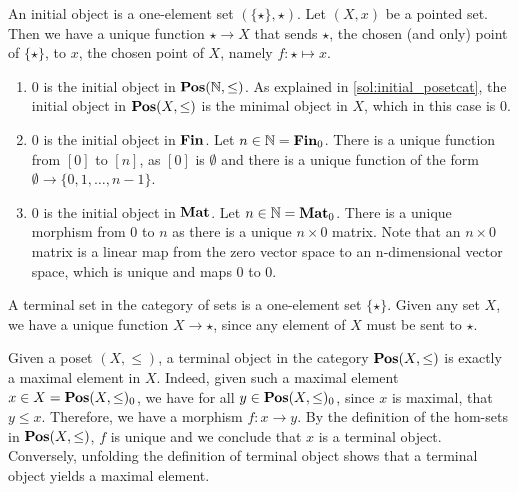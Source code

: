 \begin{solution}\label{sol:initial_pointset}
	An initial object is a one-element set $ (\{ \star \}, \star) $. Let $ (X, x) $ be a pointed set. Then we have a unique function $ \star \to X $ that sends $ \star $, the chosen (and only) point of $ \{ \star \} $, to $ x $, the chosen point of $ X $, namely $ f: \star \mapsto x $.
\end{solution}

\begin{solution}\label{sol:initial_cats_of_nats}
\begin{enumerate}
	\item $0$ is the initial object in $\mathbf{Pos}(\mathbb{N},\leq)$. As explained in \cref{sol:initial_posetcat}, the initial object in $\mathbf{Pos}(X,\leq)$ is the minimal object in $X$, which in this case is $0$.
	\item $0$ is the initial object in $\mathbf{Fin}$. Let $n \in \mathbb{N} = \mathbf{Fin}_0$. There is a unique function from $[0]$ to $[n]$, as $[0]$ is $\emptyset$ and there is a unique function of the form $\emptyset \to \{0, 1, \dots, n-1\}$.
	\item $0$ is the initial object in $\mathbf{Mat}$. Let $n \in \mathbb{N} = \mathbf{Mat}_0$. There is a unique morphism from $0$ to $n$ as there is a unique $n \times 0$ matrix. 
     Note that an $n \times 0$ matrix is a linear map from the zero vector space to an n-dimensional vector space, which is unique and maps 0 to 0. 
\end{enumerate}
\end{solution}

\begin{solution}\label{sol:terminal_set}
	A terminal set in the category of sets is a one-element set $ \{ \star \} $. Given any set $ X $, we have a unique function $ X \to \star $, since any element of $ X $ must be sent to $ \star $.
\end{solution}

\begin{solution}\label{sol:terminal_posetcat}
	Given a poset $ (X, \leq) $, a terminal object in the category $ \mathbf{Pos}(X, \leq) $ is exactly a maximal element in $ X $. Indeed, given such a maximal element $ x \in X = \mathbf{Pos}(X, \leq)_0 $, we have for all $ y \in \mathbf{Pos}(X, \leq)_0 $, since $ x $ is maximal, that $ y \leq x $. Therefore, we have a morphism $ f: x \to y $. By the definition of the hom-sets in $ \mathbf{Pos}(X, \leq) $, $ f $ is unique and we conclude that $ x $ is a terminal object.
	Conversely, unfolding the definition of terminal object shows that a terminal object yields a maximal element.
\end{solution}

